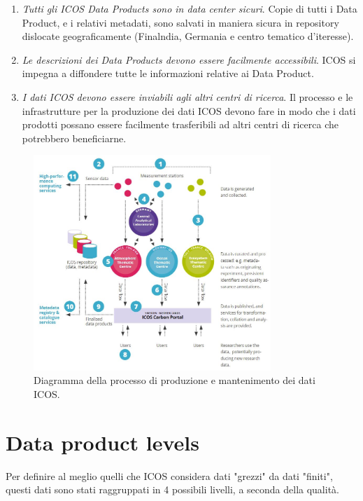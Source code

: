 \begin{enumerate}
    \item \textit{Tutti gli ICOS Data Products sono in data center sicuri}. Copie di tutti i Data Product, e i relativi metadati,
    sono salvati in maniera sicura in repository dislocate geograficamente (Finalndia, Germania e centro tematico d'iteresse).
    \item \textit{Le descrizioni dei Data Products devono essere facilmente accessibili}. ICOS si impegna a diffondere tutte le informazioni relative ai Data Product.
    \item \textit{I dati ICOS devono essere inviabili agli altri centri di ricerca}. Il processo e le infrastrutture per la produzione dei dati ICOS devono fare in modo che i dati prodotti possano essere facilmente 
    trasferibili ad altri centri di ricerca che potrebbero beneficiarne.
\end{enumerate}

\begin{figure}[h!]
    \centering
    \includegraphics[width=0.8\textwidth]{figures/data-process.JPG}
    \caption{Diagramma della processo di produzione e mantenimento dei dati ICOS.}
    \label{figure:data-process}
\end{figure}


\section{Data product levels}
\label{section:data-level}
Per definire al meglio quelli che ICOS considera dati "grezzi" da dati "finiti",
questi dati sono stati raggruppati in 4 possibili livelli, a seconda della qualità.

